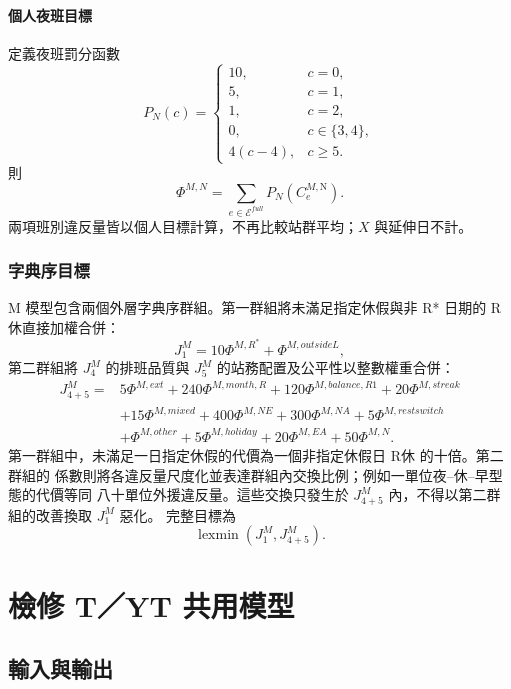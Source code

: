 \documentclass[a4paper,12pt]{article}
\begin{document}
\paragraph{個人夜班目標}
定義夜班罰分函數
\[
  P_N(c)=
  \begin{cases}
    10,&c=0,\\
    5,&c=1,\\
    1,&c=2,\\
    0,&c\in\{3,4\},\\
    4(c-4),&c\geq5.
  \end{cases}
\]
則
\[
  \Phi^{M,N}=\sum_{e\in\mathcal E^{full}}P_N(C^{M,\mathrm N}_e).
\]
兩項班別違反量皆以個人目標計算，不再比較站群平均；\(X\) 與延伸日不計。

\subsubsection{字典序目標}

M 模型包含兩個外層字典序群組。第一群組將未滿足指定休假與非 R* 日期的 R休直接加權合併：
\[
  J^M_1=10\Phi^{M,R^*}+\Phi^{M,outsideL},
\]
第二群組將 \(J^M_4\) 的排班品質與 \(J^M_5\) 的站務配置及公平性以整數權重合併：
\[
  \begin{aligned}
    J^M_{4+5}={}&
    5\Phi^{M,ext}
    +240\Phi^{M,month,R}
    +120\Phi^{M,balance,R1}
    +20\Phi^{M,streak}\\
    &+15\Phi^{M,mixed}
    +400\Phi^{M,NE}
    +300\Phi^{M,NA}
    +5\Phi^{M,restswitch}\\
    &+\Phi^{M,other}
    +5\Phi^{M,holiday}
    +20\Phi^{M,EA}
    +50\Phi^{M,N}.
  \end{aligned}
\]
第一群組中，未滿足一日指定休假的代價為一個非指定休假日 R休 的十倍。第二群組的
係數則將各違反量尺度化並表達群組內交換比例；例如一單位夜--休--早型態的代價等同
八十單位外援違反量。這些交換只發生於 \(J^M_{4+5}\) 內，不得以第二群組的改善換取
\(J^M_1\) 惡化。
完整目標為
\[
  \operatorname{lexmin}
  \left(J^M_1,J^M_{4+5}\right).
\]

\section{檢修 T／YT 共用模型}

\subsection{輸入與輸出}
\end{document}
